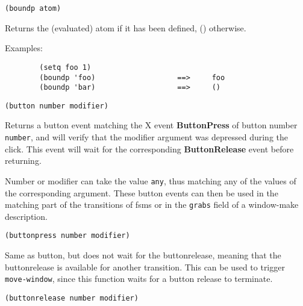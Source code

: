 {\usagefont\begin{verbatim}
(boundp atom)
\end{verbatim}}\usageupspace

Returns the (evaluated) atom if it has been defined, () otherwise.

{Examples:\exemplefont\upspace\begin{verbatim}
        (setq foo 1)
        (boundp 'foo)                   ==>     foo
        (boundp 'bar)                   ==>     ()
\end{verbatim}}

        
{\usagefont\begin{verbatim}
(button number modifier)
\end{verbatim}}\usageupspace

Returns a button event matching the X event {\bf ButtonPress} of button
number \verb"number", and will verify that
the modifier argument was depressed during the click. This event will wait
for the corresponding {\bf ButtonRelease} event before returning.  

Number or modifier can take the value \verb"any", thus matching any of the
values of the corresponding argument.  These button events can then be used
in the matching part of the transitions of fsms or in the \verb"grabs"
field of a window-make description.


        
{\usagefont\begin{verbatim}
(buttonpress number modifier)
\end{verbatim}}\usageupspace

Same as button, but does not wait for the buttonrelease, meaning that the
buttonrelease is available for another transition.
This can be used to trigger \verb"move-window", since this function waits for
a button release to terminate.

        
{\usagefont\begin{verbatim}
(buttonrelease number modifier)
\end{verbatim}}\usageupspace

